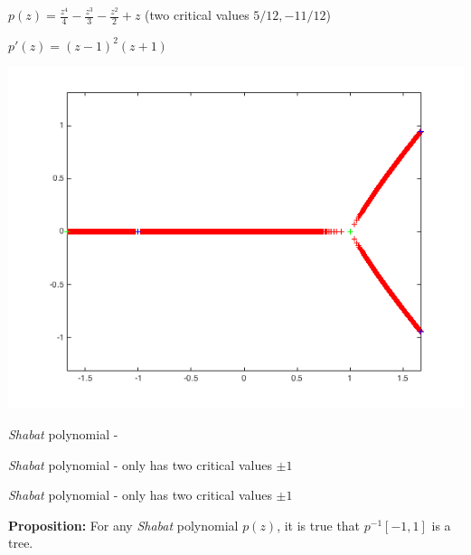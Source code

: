 \documentclass{beamer}
\begin{document}
\begin{frame}

$p(z)=\frac{z^4}{4} - \frac{z^3}{3} - \frac{z^2}{2} + z$ (two critical values $5/12, -11/12$)

\vspace{5mm}

$p'(z)=(z-1)^2(z+1)$

\includegraphics[scale=.5]{two}

\end{frame}








\begin{frame}

{\it Shabat} polynomial - 

\end{frame}


\begin{frame}

{\it Shabat} polynomial - only has two critical values $\pm 1$

\end{frame}



\begin{frame}

{\it Shabat} polynomial - only has two critical values $\pm 1$

\vspace{5mm}

{\bf Proposition:} For any {\it Shabat} polynomial $p(z)$, it is true that $p^{-1}[-1,1]$ is a tree.

\end{frame}
\end{document}

